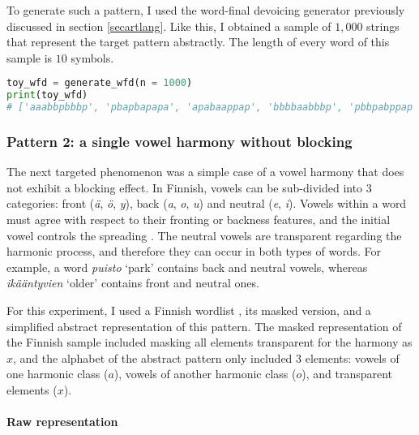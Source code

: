 To generate such a pattern, I used the word-final devoicing generator previously discussed in section \ref{secartlang}.
Like this, I obtained a sample of $1,000$ strings that represent the target pattern abstractly.
The length of every word of this sample is $10$ symbols.

\begin{lstlisting}[language=Python]
toy_wfd = generate_wfd(n = 1000)
print(toy_wfd)
# ['aaabbpbbbp', 'pbapbapapa', 'apabaappap', 'bbbbaabbbp', 'pbbpabppap', ...]
\end{lstlisting}


\subsubsection{Pattern 2: a single vowel harmony without blocking}

The next targeted phenomenon was a simple case of a vowel harmony that does not exhibit a blocking effect.
In Finnish, vowels can be sub-divided into $3$ categories: front (\emph{\"a}, \emph{\"o}, \emph{y}), back (\emph{a}, \emph{o}, \emph{u}) and neutral (\emph{e}, \emph{i}).
Vowels within a word must agree with respect to their fronting or backness features, and the initial vowel controls the spreading \citep{RoseWalker2011}.
The neutral vowels are transparent regarding the harmonic process, and therefore they can occur in both types of words.
For example, a word \emph{puisto} `park' contains back and neutral vowels, whereas \emph{ik\"a\"antyvien} `older' contains front and neutral ones.

For this experiment, I used a Finnish wordlist \href{https://github.com/douglasbuzatto/WordLists}{\faGithub} \citep{GHdouglasbuzatto}, its masked version, and a simplified abstract representation of this pattern.
The masked representation of the Finnish sample included masking all elements transparent for the harmony as $x$, and the alphabet of the abstract pattern only included $3$ elements: vowels of one harmonic class ($a$), vowels of another harmonic class ($o$), and transparent elements ($x$).


\paragraph{Raw representation}


